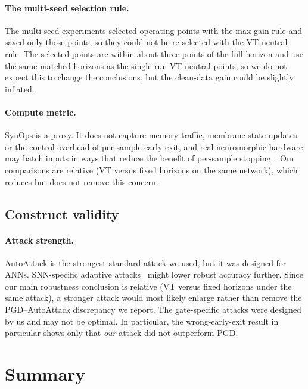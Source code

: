 \paragraph{The multi-seed selection rule.} The multi-seed experiments selected operating points with the max-gain rule and saved only those points, so they could not be re-selected with the VT-neutral rule. The selected points are within about three points of the full horizon and use the same matched horizons as the single-run VT-neutral points, so we do not expect this to change the conclusions, but the clean-data gain could be slightly inflated.

\paragraph{Compute metric.} SynOps is a proxy. It does not capture memory traffic, membrane-state updates or the control overhead of per-sample early exit, and real neuromorphic hardware may batch inputs in ways that reduce the benefit of per-sample stopping~\cite{dampfhoffer2023snns}. Our comparisons are relative (VT versus fixed horizons on the same network), which reduces but does not remove this concern.

\subsection{Construct validity}

\paragraph{Attack strength.} AutoAttack is the strongest standard attack we used, but it was designed for ANNs. SNN-specific adaptive attacks~\cite{wang2026towards} might lower robust accuracy further. Since our main robustness conclusion is relative (VT versus fixed horizons under the same attack), a stronger attack would most likely enlarge rather than remove the PGD--AutoAttack discrepancy we report. The gate-specific attacks were designed by us and may not be optimal. In particular, the wrong-early-exit result in particular shows only that \emph{our} attack did not outperform PGD.

\section{Summary}

